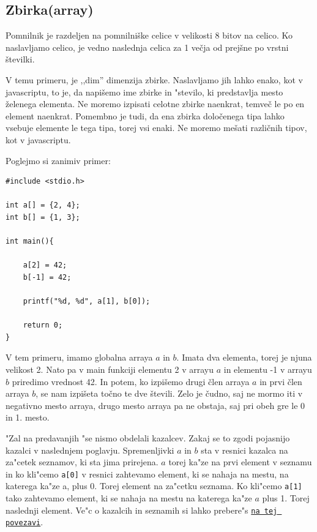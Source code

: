 \documentclass[a4paper, 12pt]{article}
\begin{document}
\subsection{Zbirka(array)}
Pomnilnik je razdeljen na pomnilniške celice v velikosti 8 bitov na celico. Ko naslavljamo celico, je vedno naslednja celica za 1 večja od prejšne po vrstni številki. \

\begin{center}
\end{center}

V temu primeru, je ,,dim'' dimenzija zbirke. Naslavljamo jih lahko enako, kot v javascriptu, to je, da napišemo ime zbirke in "stevilo, ki predstavlja mesto želenega elementa. Ne moremo izpisati celotne zbirke naenkrat, temveč le po en element naenkrat. Pomembno je tudi, da ena zbirka določenega tipa lahko vsebuje elemente le tega tipa, torej vsi enaki. Ne moremo mešati različnih tipov, kot v javascriptu.

Poglejmo si zanimiv primer:

\begin{lstlisting}
#include <stdio.h>

int a[] = {2, 4};
int b[] = {1, 3};

int main(){

	a[2] = 42;
	b[-1] = 42;

	printf("%d, %d", a[1], b[0]);

	return 0;
}
\end{lstlisting}

V tem primeru, imamo globalna arraya $a$ in $b$. Imata dva elementa, torej je njuna velikost 2. Nato pa v main funkciji elementu 2 v arrayu $a$ in elementu -1 v arrayu $b$ priredimo vrednost 42. In potem, ko izpišemo drugi člen arraya $a$ in prvi člen arraya $b$, se nam izpišeta točno te dve števili. Zelo je čudno, saj ne mormo iti v negativno mesto arraya, drugo mesto arraya pa ne obstaja, saj pri obeh gre le 0 in 1. mesto.

"Zal na predavanjih "se nismo obdelali kazalcev. Zakaj se to zgodi pojasnijo kazalci v naslednjem poglavju. Spremenljivki $a$ in $b$ sta v resnici kazalca na za"cetek seznamov, ki sta jima prirejena. $a$ torej ka"ze na prvi element v seznamu in ko kli"cemo \lstinline|a[0]| v resnici zahtevamo element, ki se nahaja na mestu, na katerega ka"ze a, plus 0. Torej element na za"cetku seznama. Ko kli"cemo \lstinline|a[1]| tako zahtevamo element, ki se nahaja na mestu na katerega ka"ze $a$ plus 1. Torej naslednji element. Ve"c o kazalcih in seznamih si lahko prebere"s  \href{https://github.com/DzinVision/c-uvod}{\texttt{na tej povezavi}}.
\end{document}
